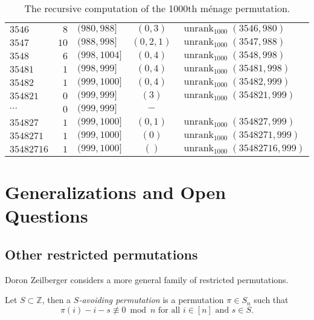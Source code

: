 \begin{example}
\begin{table}
\begin{tabular}{|l|r|l|c|l|}
      $3546    $ & $8$   & $(980,988]$        & $(0,3)$   & $\operatorname{unrank}_{1000}(3546,980)$     \\
      $3547    $ & $10$  & $(988,998]$        & $(0,2,1)$ & $\operatorname{unrank}_{1000}(3547,988)$     \\
      $3548    $ & $6$   & $(998,1004]$       & $(0,4)$   & $\operatorname{unrank}_{1000}(3548,998)$     \\ \hline
      $35481   $ & $1$   & $(998,999]$        & $(0,4)$   & $\operatorname{unrank}_{1000}(35481,998)$    \\
      $35482   $ & $1$   & $(999,1000]$       & $(0,4)$   & $\operatorname{unrank}_{1000}(35482,999)$    \\ \hline
      $354821  $ & $0$   & $(999,999]$        & $(3)$     & $\operatorname{unrank}_{1000}(354821,999)$   \\
      $\cdots$   & $0$   & $(999,999]$        & $-$       & \\
      $354827  $ & $1$   & $(999,1000]$       & $(0,1)$   & $\operatorname{unrank}_{1000}(354827,999)$   \\ \hline
      $3548271 $ & $1$   & $(999,1000]$       & $(0)$     & $\operatorname{unrank}_{1000}(3548271,999)$  \\ \hline
      $35482716$ & $1$   & $(999,1000]$       & $()$      & $\operatorname{unrank}_{1000}(35482716,999)$ \\ \hline
    \end{tabular}
    \caption[Steps for computing the $1000$th m\'enage permutation in $S_8$.]{
      The recursive computation of the 1000th m\'enage permutation.
    }
  \end{table}
\end{example}

\section{Generalizations and Open Questions}
\subsection{Other restricted permutations}
Doron Zeilberger considers a more general family of restricted permutations.
\begin{definition}
  Let $S \subset \mathbb Z$, then a \textit{$S$-avoiding permutation} is a
  permutation $\pi \in S_n$ such that \[
    \pi(i) - i - s \not\equiv 0 \bmod n \text{ for all } i \in [n] \text{ and } s \in S.
  \]
\end{definition}

